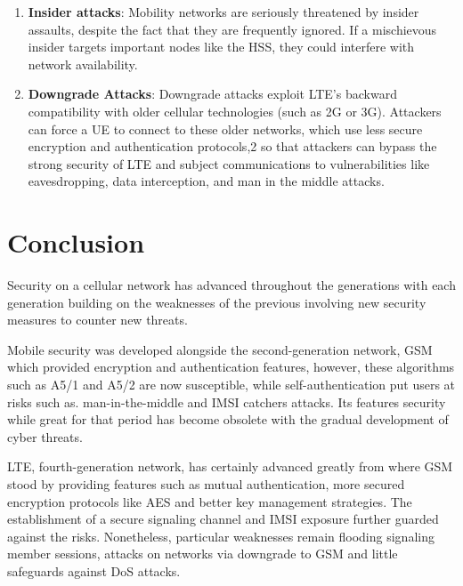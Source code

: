 \documentclass[conference]{IEEEtran}
\begin{document}
\begin{enumerate}
            \item \textbf{Insider attacks}:
            Mobility networks are seriously threatened by insider assaults, despite the fact that they are frequently ignored. If a mischievous insider targets important nodes like the HSS, they could interfere with network availability\cite{cichonski2016guide}. 

            \item \textbf{Downgrade Attacks}:
            Downgrade attacks exploit LTE’s backward compatibility with older cellular technologies (such as 2G or 3G). Attackers can force a UE to connect to these older networks, which use less secure encryption and authentication protocols,2 so that attackers can bypass the strong security of LTE and subject communications to vulnerabilities like eavesdropping, data interception, and man in the middle attacks\cite{cao2013survey}.
 

             
        \end{enumerate}



\section{Conclusion}
Security on a cellular network has advanced throughout the generations with each generation building on the weaknesses of the previous involving new security measures to counter new threats. 

Mobile security was developed alongside the second-generation network, GSM which provided encryption and authentication features, however, these algorithms such as A5/1 and A5/2 are now susceptible, while self-authentication put users at risks such as. man-in-the-middle and IMSI catchers attacks. Its features security while great for that period has become obsolete with the gradual development of cyber threats. \cite{kaur2012review}

LTE, fourth-generation network, has certainly advanced greatly from where GSM stood by providing features such as mutual authentication, more secured encryption protocols like AES and better key management strategies. The establishment of a secure signaling channel and IMSI exposure further guarded against the risks. Nonetheless, particular weaknesses remain flooding signaling member sessions, attacks on networks via downgrade to GSM and little safeguards against DoS attacks.
\end{document}
